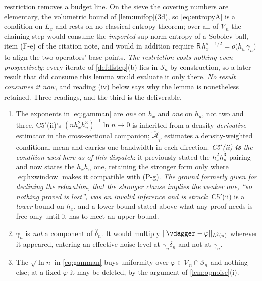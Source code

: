 \begin{lemma}
restriction removes a budget line. On the sieve the covering numbers are elementary, the volumetric
bound of \cref{lem:unifop}(3d), so \eqref{eq:entropyA} is a condition on $L_x$ and rests on no
classical entropy theorem; over all of $\mathcal V_n$ the chaining step would consume the
\emph{imported} sup-norm entropy of a Sobolev ball, item (F-e) of the citation note, and would in
addition require $\mathsf R\,h_x^{s-1/2}=o\big(h_u\,\gamma_n\big)$ to align the two operators' base
points. \emph{The
restriction costs nothing even prospectively}: every iterate of \cref{def:lfstep}(b) lies in
$\mathcal S_n$ by construction, so a later result that did consume this lemma would evaluate it only
there. \emph{No result consumes it now}, and reading (iv) below says why the lemma is nonetheless
retained.
Three readings, and the third is the deliverable.
\begin{enumerate}
\item[(i)] The exponents in \eqref{eq:gamman} are \emph{one} on $h_x$ and \emph{one} on $h_u$, not two
and three. C5$'$(ii)'s $(n h_x^{2}h_u^{3})^{-1}\ln n\to0$ is inherited from a density-\emph{derivative}
estimator in the cross-sectional companion; $\hat{\mathcal A}_\varphi$ estimates a density-weighted
conditional mean and carries one bandwidth in each direction. \emph{C5$'$(ii) \textbf{is} the condition
used here as of this dispatch}: it previously stated the $h_x^{2}h_u^{3}$ pairing and now states the
$h_xh_u$ one, retaining the stronger form only where \eqref{eq:hxwindow} makes it compatible with (P-g).
\emph{The ground formerly given for declining the relaxation, that the stronger clause implies the
weaker one, ``so nothing proved is lost'', was an invalid inference and is struck}: C5$'$(ii) is a
\emph{lower} bound on $h_x$, and a lower bound stated above what any proof needs is free only until it has
to meet an upper bound.
\item[(ii)] $\gamma_n$ is \emph{not} a component of $\hat\delta_n$. It would multiply
$\|\vdagger-\varphi\|_{L^{2}(\pi)}$ wherever it appeared, entering an effective noise level at
$\gamma_n\delta_n$ and not at $\gamma_n$.
\item[(iii)] The $\sqrt{\ln n}$ in \eqref{eq:gamman} buys uniformity over
$\varphi\in\mathcal V_n\cap\mathcal S_n$ and nothing else; at a fixed $\varphi$ it may be deleted, by
the argument of \cref{lem:opnoise}(i).
\end{enumerate}


\end{lemma}
